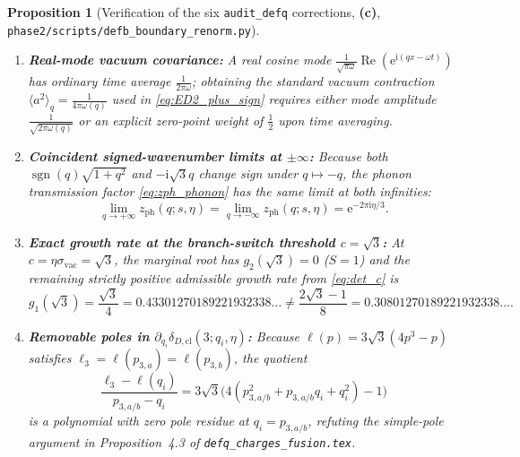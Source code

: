 \documentclass[11pt,a4paper]{article}
\newtheorem{proposition}[theorem]{Proposition}
\theoremstyle{remark}
\newcommand{\ii}{\mathrm{i}}
\newcommand{\ee}{\mathrm{e}}
\newcommand{\Rea}{\operatorname{Re}}
\newcommand{\sgn}{\operatorname{sgn}}
\newcommand{\Lc}{\textbf{(c)}}
\newcommand{\sren}{\texttt{phase2/\allowbreak scripts/\allowbreak defb\_\allowbreak boundary\_\allowbreak renorm.py}}
\begin{document}
\begin{proposition}[Verification of the six \texttt{audit\_defq} corrections, \Lc, \sren]
\begin{enumerate}
(In \texttt{defq\_oneloop\_renorm.py}, a sign error in the printed string on
line~350 produced a false minus sign in Eq.~(27) of
\texttt{defq\_charges\_fusion.tex}, while a typo replacing $a_x^2+a_x b_x+b_x^2 \mapsto q^2(2+\Rea z)$
by $q^2(1+2\Rea z)$ on line~293 produced a spurious mismatch between
$\langle E_{D,2}\rangle_{\mathrm{sym}}$ and $\langle K\rangle_{\mathrm{sym}}$.)
\item \textbf{Real-mode vacuum covariance:}
A real cosine mode $\frac{1}{\sqrt{\pi\omega}}\Rea(\ee^{\ii(qx-\omega t)})$ has
ordinary time average $\frac{1}{2\pi\omega}$; obtaining the standard vacuum
contraction $\langle a^2\rangle_q = \frac{1}{4\pi\omega(q)}$ used in
\eqref{eq:ED2_plus_sign} requires either mode amplitude
$\frac{1}{\sqrt{2\pi\omega(q)}}$ or an explicit zero-point weight of
$\frac{1}{2}$ upon time averaging.
\item \textbf{Coincident signed-wavenumber limits at $\pm\infty$:}
Because both $\sgn(q)\sqrt{1+q^2}$ and $-\ii\sqrt{3}q$ change sign under
$q \mapsto -q$, the phonon transmission factor \eqref{eq:zph_phonon} has the
\emph{same} limit at both infinities:
\begin{equation}\label{eq:zph_limits}
  \lim_{q\to +\infty} z_{\mathrm{ph}}(q;s,\eta)
  = \lim_{q\to -\infty} z_{\mathrm{ph}}(q;s,\eta)
  = \ee^{-2\pi\ii\eta/3}.
\end{equation}
\item \textbf{Exact growth rate at the branch-switch threshold $c = \sqrt{3}$:}
At $c = \eta\sigma_{\mathrm{vac}} = \sqrt{3}$, the marginal root has
$g_2(\sqrt{3}) = 0$ ($S=1$) and the remaining strictly positive admissible
growth rate from \eqref{eq:det_c} is
\begin{equation}\label{eq:g1_sqrt3}
  g_1(\sqrt{3}) = \frac{\sqrt{3}}{4} = 0.43301270189221932338\ldots
  \ne \frac{2\sqrt{3}-1}{8} = 0.30801270189221932338\ldots.
\end{equation}
\item \textbf{Removable poles in $\partial_{q_i}\delta_{D,\mathrm{cl}}(3;q_i,\eta)$:}
Because $\ell(p) = 3\sqrt{3}(4p^3 - p)$ satisfies $\ell_3 = \ell(p_{3,a}) = \ell(p_{3,b})$,
the quotient
\begin{equation}\label{eq:ell_quotient}
  \frac{\ell_3 - \ell(q_i)}{p_{3,a/b} - q_i}
  = 3\sqrt{3}\Big(4(p_{3,a/b}^2 + p_{3,a/b}q_i + q_i^2) - 1\Big)
\end{equation}
is a polynomial with zero pole residue at $q_i = p_{3,a/b}$, refuting the
simple-pole argument in Proposition~4.3 of \texttt{defq\_charges\_fusion.tex}.
\end{enumerate}
\end{proposition}
\end{document}
